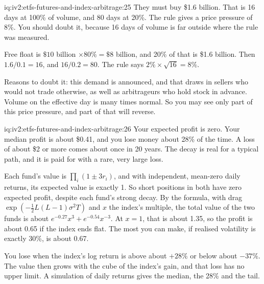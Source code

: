 \begin{solution}{iq:iv2:etfs-futures-and-index-arbitrage:25}
They must buy \$1.6 billion. That is 16 days at 100\% of volume, and 80 days at 20\%. The rule gives a price pressure of 8\%. You should doubt it, because 16 days of volume is far outside where the rule was measured.

Free float is $\$10$ billion $\times 80\% = \$8$ billion, and 20\% of that is \$1.6 billion. Then $1.6/0.1 = 16$, and $16/0.2 = 80$. The rule says $2\% \times \sqrt{16} = 8\%$.

Reasons to doubt it: this demand is announced, and that draws in sellers who would not trade otherwise, as well as arbitrageurs who hold stock in advance. Volume on the effective day is many times normal. So you may see only part of this price pressure, and part of that will reverse.

\end{solution}

\begin{solution}{iq:iv2:etfs-futures-and-index-arbitrage:26}
Your expected profit is zero. Your median profit is about \$0.41, and you lose money about 28\% of the time. A loss of about \$2 or more comes about once in 20 years. The decay is real for a typical path, and it is paid for with a rare, very large loss.

Each fund's value is $\prod_i(1 \pm 3r_i)$, and with independent, mean-zero daily returns, its expected value is exactly 1. So short positions in both have zero expected profit, despite each fund's strong decay. By the formula, with drag $\exp(-\tfrac12L(L - 1)\sigma^2T)$ and $x$ the index's multiple, the total value of the two funds is about $e^{-0.27}x^3 + e^{-0.54}x^{-3}$. At $x = 1$, that is about 1.35, so the profit is about 0.65 if the index ends flat. The most you can make, if realised volatility is exactly 30\%, is about 0.67.

You lose when the index's log return is above about $+28\%$ or below about $-37\%$. The value then grows with the cube of the index's gain, and that loss has no upper limit. A simulation of daily returns gives the median, the 28\% and the tail.

\end{solution}

